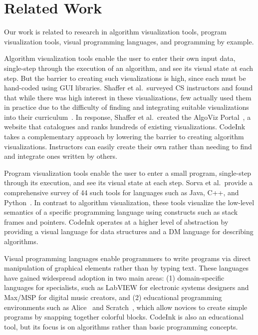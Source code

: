 \section{Related Work}

Our work is related to research in algorithm visualization tools,
program visualization tools, visual programming languages, and programming by
example.

Algorithm visualization tools enable the user to enter their own input data,
single-step through the execution of an algorithm, and see its visual state at
each step. But the barrier to creating such visualizations is high, since each
must be hand-coded using GUI libraries. Shaffer et al.\ surveyed CS instructors
and found that while there was high interest in these visualizations, few
actually used them in practice due to the difficulty of finding and integrating
suitable visualizations into their curriculum~\cite{Shaffer2011}. In response,
Shaffer et al.\ created the AlgoViz Portal~\cite{AlgoViz}, a website that
catalogues and ranks hundreds of existing visualizations. CodeInk takes a
complementary approach by lowering the barrier to creating algorithm
visualizations. Instructors can easily create their own rather than needing to
find and integrate ones written by others.


Program visualization tools enable the user to enter a small program,
single-step through its execution, and see its visual state at each step. Sorva
et al.\ provide a comprehensive survey of 44 such tools for
languages such as Java, C++, and Python~\cite{Sorva2013}. In contrast to algorithm visualization, these tools
visualize the low-level semantics of a specific programming language using
constructs such as stack frames and pointers. CodeInk operates at a higher level
of abstraction by providing a visual language for data structures and a DM
language for describing algorithms.


Visual programming languages enable programmers to write programs via
direct manipulation of graphical elements rather than by typing text. These
languages have gained widespread adoption in two main areas:
(1) domain-specific languages for specialists, such as LabVIEW for electronic
systems designers and Max/MSP for digital music creators, and (2) educational
programming environments such as Alice~\cite{Alice2008} and
Scratch~\cite{Scratch2008}, which allow novices to create simple programs by
snapping together colorful blocks. CodeInk is also an educational tool, but its
focus is on algorithms rather than basic programming concepts.

